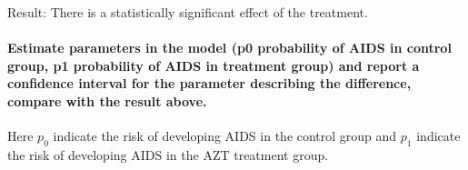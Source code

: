 \documentclass[
]{article}
\begin{document}
Result: There is a statistically significant effect of the treatment.

\hypertarget{estimate-parameters-in-the-model-p0-probability-of-aids-in-control-group-p1-probability-of-aids-in-treatment-group-and-report-a-confidence-interval-for-the-parameter-describing-the-difference-compare-with-the-result-above.}{%
\paragraph{Estimate parameters in the model (p0 probability of AIDS in
control group, p1 probability of AIDS in treatment group) and report a
confidence interval for the parameter describing the difference, compare
with the result
above.}\label{estimate-parameters-in-the-model-p0-probability-of-aids-in-control-group-p1-probability-of-aids-in-treatment-group-and-report-a-confidence-interval-for-the-parameter-describing-the-difference-compare-with-the-result-above.}}

Here \(p_0\) indicate the risk of developing AIDS in the control group
and \(p_1\) indicate the risk of developing AIDS in the AZT treatment
group.
\end{document}
